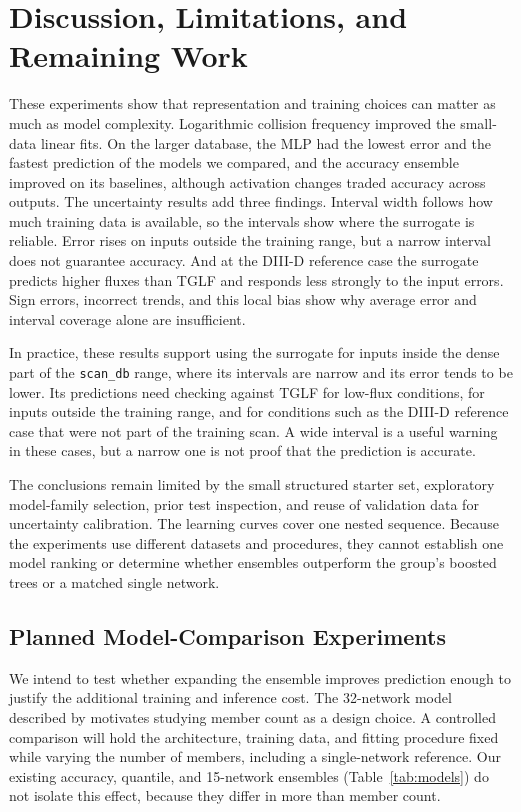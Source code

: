 \documentclass[12pt,letterpaper]{article}
\begin{document}
\section{Discussion, Limitations, and Remaining Work}
\label{sec:discussion}

These experiments show that representation and training choices can matter
as much as model complexity. Logarithmic collision frequency improved the
small-data linear fits. On the larger database, the MLP had the lowest error
and the fastest prediction of the models we compared, and the accuracy
ensemble improved on its baselines, although activation changes traded
accuracy across outputs. The uncertainty results add three findings. Interval
width follows how much training data is available, so the intervals show where
the surrogate is reliable. Error rises on inputs outside the training range,
but a narrow interval does not guarantee accuracy. And at the DIII-D reference
case the surrogate predicts higher fluxes than TGLF and responds less strongly
to the input errors. Sign errors, incorrect trends, and this local bias show
why average error and interval coverage alone are insufficient.

In practice, these results support using the surrogate for inputs inside the
dense part of the \texttt{scan\_db} range, where its intervals are narrow and
its error tends to be lower. Its predictions need checking against TGLF for
low-flux conditions, for inputs outside the training range, and for conditions
such as the DIII-D reference case that were not part of the training scan. A
wide interval is a useful warning in these cases, but a narrow one is not proof
that the prediction is accurate.

The conclusions remain limited by the small structured starter set,
exploratory model-family selection, prior test inspection, and reuse of
validation data for uncertainty calibration. The learning curves cover one
nested sequence. Because the experiments use different datasets and
procedures, they cannot establish one model ranking or determine whether
ensembles outperform the group's boosted trees or a matched single network.

\subsection{Planned Model-Comparison Experiments}

We intend to test whether expanding the ensemble improves prediction enough
to justify the additional training and inference cost. The 32-network model
described by \citet{meneghini2017} motivates studying member count as a design
choice. A controlled comparison will hold the architecture, training data,
and fitting procedure fixed while varying the number of members, including
a single-network reference. Our existing accuracy, quantile, and 15-network
ensembles (Table~\ref{tab:models}) do not isolate this effect, because they
differ in more than member count.
\end{document}
